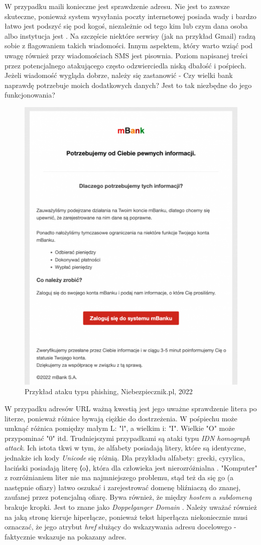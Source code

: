 \documentclass[]{article}
\begin{document}
W przypadku maili konieczne jest sprawdzenie adresu. Nie jest to zawsze skuteczne, ponieważ system wysyłania poczty internetowej posiada wady i bardzo łatwo jest podszyć się pod kogoś, niezależnie od tego kim lub czym dana osoba albo instytucja jest \cite{hackernoon_mail}. Na szczęście niektóre serwisy (jak na przykład Gmail) radzą sobie z flagowaniem takich wiadomości. Innym aspektem, który warto wziąć pod uwagę również przy wiadomościach SMS jest pisownia. Poziom napisanej treści przez potencjalnego atakującego często odzwierciedla niską dbałość i pośpiech. Jeżeli wiadomość wygląda dobrze, należy się zastanowić - Czy wielki bank naprawdę potrzebuje moich dodatkowych danych? Jest to tak niezbędne do jego funkcjonowania?
\begin{figure}[b!]
	\centering
	\includegraphics[width=0.6\linewidth]{Pictures/mbank_phishing.png}
	\caption{Przykład ataku typu phishing, Niebezpiecznik.pl, 2022}
	\label{fig:mbankPhishing}
\end{figure}

W przypadku adresów URL ważną kwestią jest jego uważne sprawdzenie litera po literze, ponieważ różnice bywają ciężkie do dostrzeżenia. W pośpiechu może umknąć różnica pomiędzy małym L: "l", a wielkim i: "I". Wielkie "O" może przypominać "0" itd. Trudniejszymi przypadkami są ataki typu \textit{IDN homograph attack}. Ich istota tkwi w tym, że alfabety posiadają litery, które są identyczne, jednakże ich kody \textit{Unicode} się różnią. Dla przykładu alfabety: grecki, cyrylica, łaciński posiadają literę ⟨o⟩, która dla człowieka jest nierozróżnialna \cite{idn_homograph}. "Komputer" z rozróżnianiem liter nie ma najmniejszego problemu, stąd też da się go (a następnie ofiary) łatwo oszukać i zarejestrować domenę bliźniaczą do znanej, zaufanej przez potencjalną ofiarę. Bywa również, że między \textit{hostem} a \textit{subdomeną} brakuje kropki. Jest to znane jako \textit{Doppelganger Domain} \cite{doppelganger}. Należy uważać również na jaką stronę kieruje hiperłącze, ponieważ tekst hiperłącza niekoniecznie musi oznaczać, że jego atrybut \textit{href} służący do wskazywania adresu docelowego - faktycznie wskazuje na pokazany adres.
\end{document}
